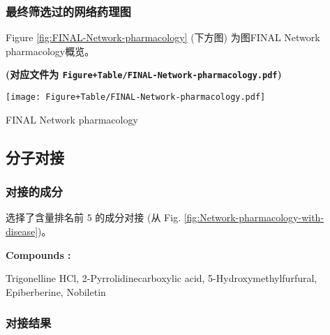 \documentclass[
]{article}
\begin{document}
\hypertarget{ux6700ux7ec8ux7b5bux9009ux8fc7ux7684ux7f51ux7edcux836fux7406ux56fe}{%
\subsubsection{最终筛选过的网络药理图}\label{ux6700ux7ec8ux7b5bux9009ux8fc7ux7684ux7f51ux7edcux836fux7406ux56fe}}

Figure \ref{fig:FINAL-Network-pharmacology} (下方图) 为图FINAL Network pharmacology概览。

\textbf{(对应文件为 \texttt{Figure+Table/FINAL-Network-pharmacology.pdf})}

\def\@captype{figure}
\begin{center}
\texttt{[image: Figure+Table/FINAL-Network-pharmacology.pdf]}
\caption{FINAL Network pharmacology}\label{fig:FINAL-Network-pharmacology}
\end{center}

\hypertarget{ux5206ux5b50ux5bf9ux63a5}{%
\subsection{分子对接}\label{ux5206ux5b50ux5bf9ux63a5}}

\hypertarget{cpd}{%
\subsubsection{对接的成分}\label{cpd}}

选择了含量排名前 5 的成分对接 (从 Fig. \ref{fig:Network-pharmacology-with-disease})。

\begin{center}\begin{tcolorbox}[colback=gray!10, colframe=gray!50, width=0.9\linewidth, arc=1mm, boxrule=0.5pt]
\textbf{
Compounds
:}

\vspace{0.5em}

    Trigonelline HCl, 2-Pyrrolidinecarboxylic acid,
5-Hydroxymethylfurfural, Epiberberine, Nobiletin

\vspace{2em}
\end{tcolorbox}
\end{center}

\hypertarget{ux5bf9ux63a5ux7ed3ux679c}{%
\subsubsection{对接结果}\label{ux5bf9ux63a5ux7ed3ux679c}}
\end{document}
